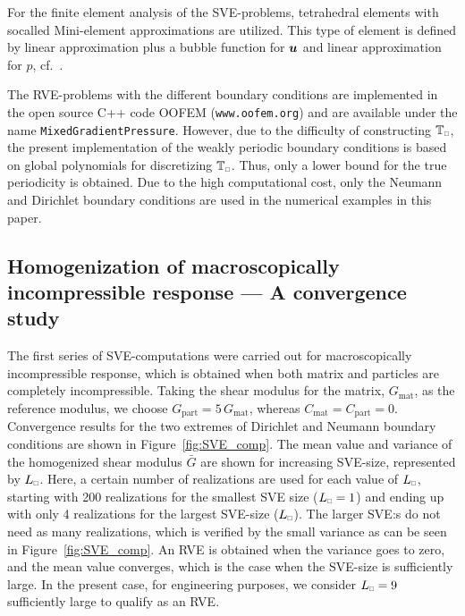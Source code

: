 \documentclass{bmcart}
\newcommand{\tikzsetnextfilename}[1]{}
\newcommand{\tikzinput}[1]{\texttt{[image: \#1]}}
\newcommand{\figref}[1]{Figure~\ref{#1}}
\newcommand{\rve}{
  {\mathchoice
   {\mbox{\scalebox{0.67}{$\Box$}}}
   {\mbox{\scalebox{0.67}{$\Box$}}}
   {\mbox{\scalebox{0.5}{$\Box$}}}
   {\mbox{\scalebox{0.375}{$\Box$}}}
  }
}
\begin{document}
For the finite element analysis of the SVE-problems, tetrahedral elements with socalled Mini-element approximations are utilized.
This type of element is defined by linear approximation plus a bubble function for $\boldsymbol{u}$ and linear approximation for $p$, cf.\ \cite{arnold_stable_1984}.

The RVE-problems with the different boundary conditions are implemented in the open source C++ code OOFEM (\texttt{www.oofem.org}) \cite{patzak_design_2001} and are available under the name \texttt{Mixed\-Gradient\-Pressure}.
However, due to the difficulty of constructing $\set{T}_\rve$, the present implementation of the weakly periodic boundary conditions is based on global polynomials for discretizing $\set{T}_\rve$.
Thus, only a lower bound for the true periodicity is obtained.
Due to the high computational cost, only the Neumann and Dirichlet boundary conditions are used in the numerical examples in this paper.


\subsection{Homogenization of macroscopically incompressible response --- A convergence study}
The first series of SVE-computations were carried out for macroscopically incompressible response, which is obtained when both matrix and particles are completely incompressible.
Taking the shear modulus for the matrix, $G_\mathrm{mat}$, as the reference modulus, we choose $G_\mathrm{part} = 5\,G_\mathrm{mat}$, whereas $C_\mathrm{mat} = C_\mathrm{part} = 0$.
Convergence results for the two extremes of Dirichlet and Neumann boundary conditions are shown in \figref{fig:SVE_comp}.
The mean value and variance of the homogenized shear modulus $\bar{G}$ are shown for increasing SVE-size, represented by $L_\rve$.
Here, a certain number of realizations are used for each value of $L_\rve$, starting with 200 realizations for the smallest SVE size ($L_\rve = 1$) and ending up with only 4 realizations for the largest SVE-size ($L_\rve$).
The larger SVE:s do not need as many realizations, which is verified by the small variance as can be seen in \figref{fig:SVE_comp}.
An RVE is obtained when the variance goes to zero, and the mean value converges, which is the case when the SVE-size is sufficiently large.
In the present case, for engineering purposes, we consider $L_\rve=9$ sufficiently large to qualify as an RVE.

\end{document}

